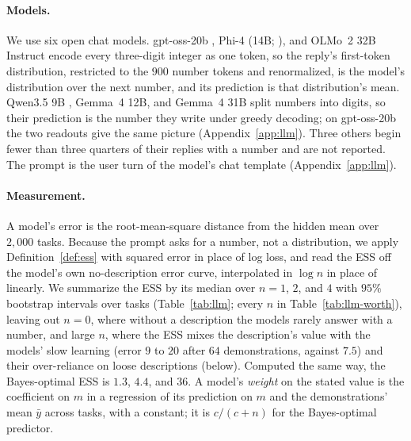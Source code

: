 \documentclass{article}
\begin{document}
\paragraph{Models.} We use six open chat models. gpt-oss-20b \citep{openai2025}, Phi-4 (14B; \citealp{abdin2024}), and OLMo~2 32B Instruct \citep{walsh2025} encode every three-digit integer as one token, so the reply's first-token distribution, restricted to the $900$ number tokens and renormalized, is the model's distribution over the next number, and its prediction is that distribution's mean. Qwen3.5 9B \citep{qwen35}, Gemma~4 12B, and Gemma~4 31B \citep{gemma4} split numbers into digits, so their prediction is the number they write under greedy decoding; on gpt-oss-20b the two readouts give the same picture (Appendix~\ref{app:llm}). Three others begin fewer than three quarters of their replies with a number and are not reported. The prompt is the user turn of the model's chat template (Appendix~\ref{app:llm}).


\paragraph{Measurement.} A model's error is the root-mean-square distance from the hidden mean over $2{,}000$ tasks. Because the prompt asks for a number, not a distribution, we apply Definition~\ref{def:ess} with squared error in place of log loss, and read the ESS off the model's own no-description error curve, interpolated in $\log n$ in place of linearly. We summarize the ESS by its median over $n = 1$, $2$, and $4$ with $95\%$ bootstrap intervals over tasks (Table~\ref{tab:llm}; every $n$ in Table~\ref{tab:llm-worth}), leaving out $n = 0$, where without a description the models rarely answer with a number, and large $n$, where the ESS mixes the description's value with the models' slow learning (error $9$ to $20$ after $64$ demonstrations, against $7.5$) and their over-reliance on loose descriptions (below). Computed the same way, the Bayes-optimal ESS is $1.3$, $4.4$, and $36$. A model's \emph{weight} on the stated value is the coefficient on $m$ in a regression of its prediction on $m$ and the demonstrations' mean $\bar y$ across tasks, with a constant; it is $c/(c+n)$ for the Bayes-optimal predictor.
\end{document}

